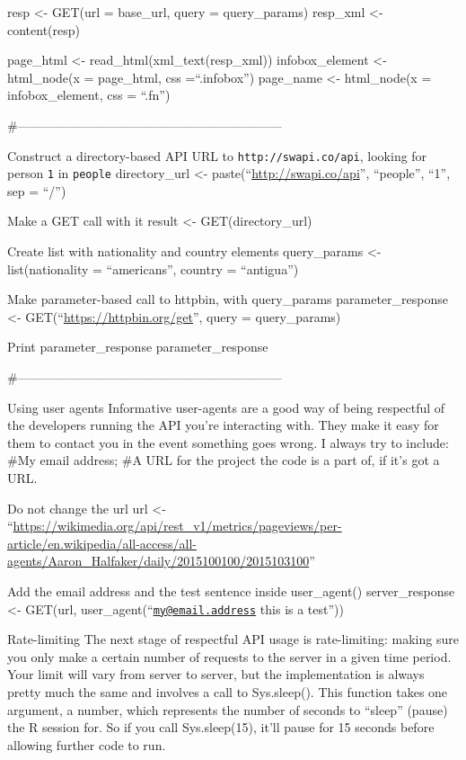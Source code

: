 \documentclass[]{book}
\begin{document}
resp \textless{}- GET(url = base\_url, query = query\_params)
resp\_xml \textless{}- content(resp)

page\_html \textless{}- read\_html(xml\_text(resp\_xml))
infobox\_element \textless{}- html\_node(x = page\_html, css =``.infobox'')
page\_name \textless{}- html\_node(x = infobox\_element, css = ``.fn'')

\#---------------------------------------------------------------

Construct a directory-based API URL to \texttt{http://swapi.co/api},
looking for person \texttt{1} in \texttt{people}
directory\_url \textless{}- paste(``\url{http://swapi.co/api}'', ``people'', ``1'', sep = ``/'')

Make a GET call with it
result \textless{}- GET(directory\_url)

Create list with nationality and country elements
query\_params \textless{}- list(nationality = ``americans'',
country = ``antigua'')

Make parameter-based call to httpbin, with query\_params
parameter\_response \textless{}- GET(``\url{https://httpbin.org/get}'', query = query\_params)

Print parameter\_response
parameter\_response

\#---------------------------------------------------------------

Using user agents
Informative user-agents are a good way of being respectful of the developers running the API you're interacting with.
They make it easy for them to contact you in the event something goes wrong. I always try to include:
\#My email address;
\#A URL for the project the code is a part of, if it's got a URL.

Do not change the url
url \textless{}- ``\url{https://wikimedia.org/api/rest_v1/metrics/pageviews/per-article/en.wikipedia/all-access/all-agents/Aaron_Halfaker/daily/2015100100/2015103100}''

Add the email address and the test sentence inside user\_agent()
server\_response \textless{}- GET(url, user\_agent(``\href{mailto:my@email.address}{\nolinkurl{my@email.address}} this is a test''))

Rate-limiting
The next stage of respectful API usage is rate-limiting: making sure you only make a certain number of requests to the server in a given time period.
Your limit will vary from server to server, but the implementation is always pretty much the same and involves a call to Sys.sleep().
This function takes one argument, a number, which represents the number of seconds to ``sleep'' (pause) the R session for.
So if you call Sys.sleep(15), it'll pause for 15 seconds before allowing further code to run.
\end{document}
